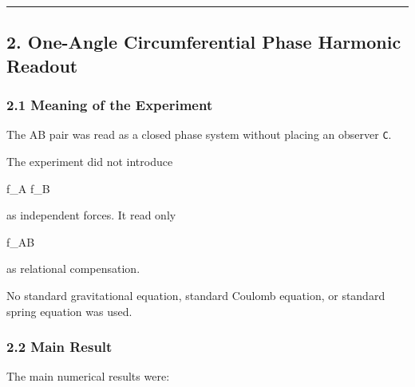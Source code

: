 \documentclass[
]{article}
\newenvironment{Shaded}{}{}
\newcommand{\NormalTok}[1]{#1}
\begin{document}
\begin{center}\rule{0.5\linewidth}{0.5pt}\end{center}

\subsection{2. One-Angle Circumferential Phase Harmonic
Readout}\label{one-angle-circumferential-phase-harmonic-readout}

\subsubsection{2.1 Meaning of the
Experiment}\label{meaning-of-the-experiment}

The AB pair was read as a closed phase system without placing an
observer \texttt{C}.

The experiment did not introduce

\begin{Shaded}
\begin{Highlighting}[]
\NormalTok{f\_A}
\NormalTok{f\_B}
\end{Highlighting}
\end{Shaded}

as independent forces. It read only

\begin{Shaded}
\begin{Highlighting}[]
\NormalTok{f\_AB}
\end{Highlighting}
\end{Shaded}

as relational compensation.

No standard gravitational equation, standard Coulomb equation, or
standard spring equation was used.

\subsubsection{2.2 Main Result}\label{main-result}

The main numerical results were:
\end{document}
